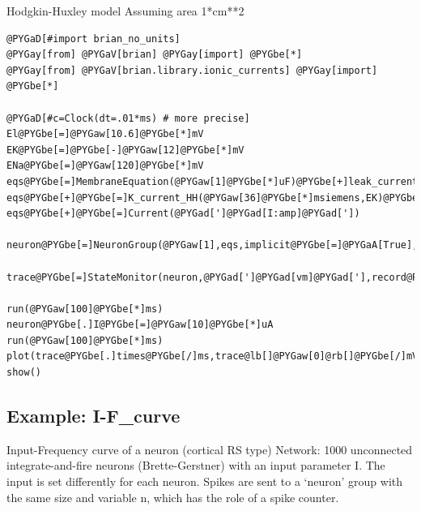 \documentclass[letterpaper,10pt]{manual}
\begin{document}
Hodgkin-Huxley model
Assuming area 1*cm**2

\begin{Verbatim}[commandchars=@\[\]]
@PYGaD[#import brian_no_units]
@PYGay[from] @PYGaV[brian] @PYGay[import] @PYGbe[*]
@PYGay[from] @PYGaV[brian.library.ionic_currents] @PYGay[import] @PYGbe[*]

@PYGaD[#c=Clock(dt=.01*ms) # more precise]
El@PYGbe[=]@PYGaw[10.6]@PYGbe[*]mV
EK@PYGbe[=]@PYGbe[-]@PYGaw[12]@PYGbe[*]mV
ENa@PYGbe[=]@PYGaw[120]@PYGbe[*]mV
eqs@PYGbe[=]MembraneEquation(@PYGaw[1]@PYGbe[*]uF)@PYGbe[+]leak_current(@PYGbe[.]@PYGaw[3]@PYGbe[*]msiemens,El)
eqs@PYGbe[+]@PYGbe[=]K_current_HH(@PYGaw[36]@PYGbe[*]msiemens,EK)@PYGbe[+]Na_current_HH(@PYGaw[120]@PYGbe[*]msiemens,ENa)
eqs@PYGbe[+]@PYGbe[=]Current(@PYGad[']@PYGad[I:amp]@PYGad['])

neuron@PYGbe[=]NeuronGroup(@PYGaw[1],eqs,implicit@PYGbe[=]@PYGaA[True],freeze@PYGbe[=]@PYGaA[True])

trace@PYGbe[=]StateMonitor(neuron,@PYGad[']@PYGad[vm]@PYGad['],record@PYGbe[=]@PYGaA[True])

run(@PYGaw[100]@PYGbe[*]ms)
neuron@PYGbe[.]I@PYGbe[=]@PYGaw[10]@PYGbe[*]uA
run(@PYGaw[100]@PYGbe[*]ms)
plot(trace@PYGbe[.]times@PYGbe[/]ms,trace@lb[]@PYGaw[0]@rb[]@PYGbe[/]mV)
show()
\end{Verbatim}

\resetcurrentobjects
{}

\hypertarget{index-23}{}\subsection{Example: I-F\_curve}

Input-Frequency curve of a neuron (cortical RS type)
Network: 1000 unconnected integrate-and-fire neurons (Brette-Gerstner)
with an input parameter I.
The input is set differently for each neuron.
Spikes are sent to a `neuron' group with the same size and variable n,
which has the role of a spike counter.
\end{document}
